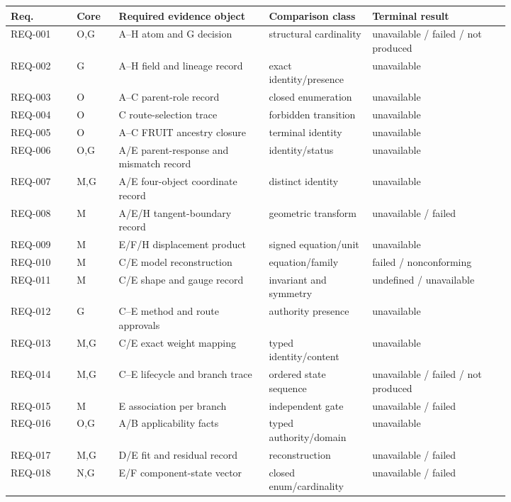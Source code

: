 \documentclass[11pt]{article}
\renewcommand{\arraystretch}{1.12}
\begin{document}
{\small
\renewcommand{\arraystretch}{1.18}
\begin{longtable}{@{}P{0.11\linewidth}P{0.07\linewidth}P{0.25\linewidth}P{0.16\linewidth}P{0.23\linewidth}@{}}
\toprule
Req. & Core & Required evidence object & Comparison class & Terminal result \\
\midrule
\endhead
REQ-001 & O,G & A--H atom and G decision & structural cardinality & unavailable / failed / not produced \\
REQ-002 & G & A--H field and lineage record & exact identity/presence & unavailable \\
REQ-003 & O & A--C parent-role record & closed enumeration & unavailable \\
REQ-004 & O & C route-selection trace & forbidden transition & unavailable \\
REQ-005 & O & A--C FRUIT ancestry closure & terminal identity & unavailable \\
REQ-006 & O,G & A/E parent-response and mismatch record & identity/status & unavailable \\
REQ-007 & M,G & A/E four-object coordinate record & distinct identity & unavailable \\
REQ-008 & M & A/E/H tangent-boundary record & geometric transform & unavailable / failed \\
REQ-009 & M & E/F/H displacement product & signed equation/unit & unavailable \\
REQ-010 & M & C/E model reconstruction & equation/family & failed / nonconforming \\
REQ-011 & M & C/E shape and gauge record & invariant and symmetry & undefined / unavailable \\
REQ-012 & G & C--E method and route approvals & authority presence & unavailable \\
REQ-013 & M,G & C/E exact weight mapping & typed identity/content & unavailable \\
REQ-014 & M,G & C--E lifecycle and branch trace & ordered state sequence & unavailable / failed / not produced \\
REQ-015 & M & E association per branch & independent gate & unavailable / failed \\
REQ-016 & O,G & A/B applicability facts & typed authority/domain & unavailable \\
REQ-017 & M,G & D/E fit and residual record & reconstruction & unavailable / failed \\
REQ-018 & N,G & E/F component-state vector & closed enum/cardinality & unavailable / failed \\

\end{longtable}}
\end{document}
